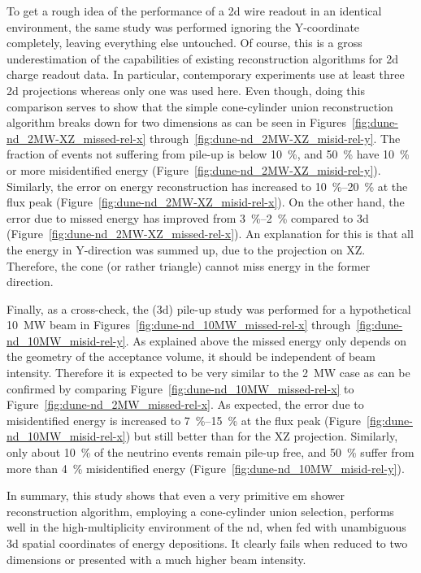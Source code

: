 To get a rough idea of the performance of a \gls{2d} wire readout in an identical environment, the same study was performed ignoring the Y-coordinate completely, leaving everything else untouched.
Of course, this is a gross underestimation of the capabilities of existing reconstruction algorithms for \gls{2d} charge readout data.
In particular, contemporary experiments use at least three \gls{2d} projections whereas only one was used here.
Even though, doing this comparison serves to show that the simple cone-cylinder union reconstruction algorithm breaks down for two dimensions as can be seen in Figures~\ref{fig:dune-nd_2MW-XZ_missed-rel-x} through~\ref{fig:dune-nd_2MW-XZ_misid-rel-y}.
The fraction of events not suffering from pile-up is below \SI{10}{\percent}, and \SI{50}{\percent} have \SI{10}{\percent} or more misidentified energy (Figure~\ref{fig:dune-nd_2MW-XZ_misid-rel-y}).
Similarly, the error on energy reconstruction has increased to \SIrange{10}{20}{\percent} at the flux peak (Figure~\ref{fig:dune-nd_2MW-XZ_misid-rel-x}).
On the other hand, the error due to missed energy has improved from \SIrange{3}{2}{\percent} compared to \gls{3d} (Figure~\ref{fig:dune-nd_2MW-XZ_missed-rel-x}).
An explanation for this is that all the energy in Y-direction was summed up, due to the projection on XZ.
Therefore, the cone (or rather triangle) cannot miss energy in the former direction.

Finally, as a cross-check, the (\gls{3d}) pile-up study was performed for a hypothetical \SI{10}{\mega\watt} beam in Figures~\ref{fig:dune-nd_10MW_missed-rel-x} through~\ref{fig:dune-nd_10MW_misid-rel-y}.
As explained above the missed energy only depends on the geometry of the acceptance volume, it should be independent of beam intensity.
Therefore it is expected to be very similar to the \SI{2}{\mega\watt} case as can be confirmed by comparing Figure~\ref{fig:dune-nd_10MW_missed-rel-x} to Figure~\ref{fig:dune-nd_2MW_missed-rel-x}.
As expected, the error due to misidentified energy is increased to \SIrange{7}{15}{\percent} at the flux peak (Figure~\ref{fig:dune-nd_10MW_misid-rel-x}) but still better than for the XZ projection.
Similarly, only about \SI{10}{\percent} of the neutrino events remain pile-up free, and \SI{50}{\percent} suffer from more than \SI{4}{\percent} misidentified energy (Figure~\ref{fig:dune-nd_10MW_misid-rel-y}).

In summary, this study shows that even a very primitive \gls{em} shower reconstruction algorithm, employing a cone-cylinder union selection, performs well in the high-multiplicity environment of the \dune{} \gls{nd}, when fed with unambiguous \gls{3d} spatial coordinates of energy depositions.
It clearly fails when reduced to two dimensions or presented with a much higher beam intensity.